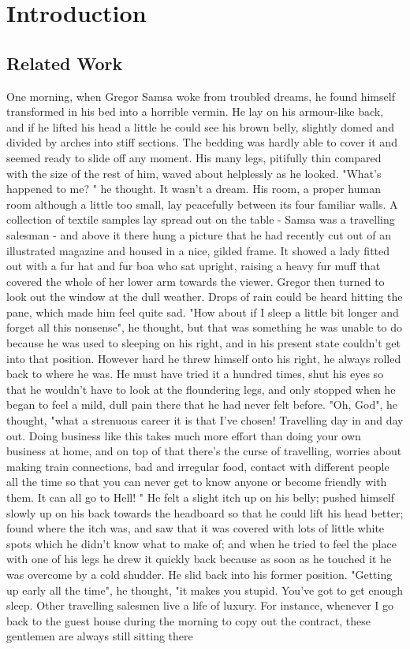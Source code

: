 \documentclass[
	listoffigures, 	%
	listoftables 	%
]{ifathesis}
\begin{document}
\chapter{Introduction}

\section{Related Work}

One morning, when Gregor Samsa woke from troubled dreams, he found himself transformed in his bed into a horrible vermin. He lay on his armour-like back, and if he lifted his head a little he could see his brown belly, slightly domed and divided by arches into stiff sections. The bedding was hardly able to cover it and seemed ready to slide off any moment. His many legs, pitifully thin compared with the size of the rest of him, waved about helplessly as he looked. "What's happened to me? " he thought. It wasn't a dream. His room, a proper human room although a little too small, lay peacefully between its four familiar walls. A collection of textile samples lay spread out on the table - Samsa was a travelling salesman - and above it there hung a picture that he had recently cut out of an illustrated magazine and housed in a nice, gilded frame. It showed a lady fitted out with a fur hat and fur boa who sat upright, raising a heavy fur muff that covered the whole of her lower arm towards the viewer. Gregor then turned to look out the window at the dull weather. Drops of rain could be heard hitting the pane, which made him feel quite sad. "How about if I sleep a little bit longer and forget all this nonsense", he thought, but that was something he was unable to do because he was used to sleeping on his right, and in his present state couldn't get into that position. However hard he threw himself onto his right, he always rolled back to where he was. He must have tried it a hundred times, shut his eyes so that he wouldn't have to look at the floundering legs, and only stopped when he began to feel a mild, dull pain there that he had never felt before. "Oh, God", he thought, "what a strenuous career it is that I've chosen! Travelling day in and day out. Doing business like this takes much more effort than doing your own business at home, and on top of that there's the curse of travelling, worries about making train connections, bad and irregular food, contact with different people all the time so that you can never get to know anyone or become friendly with them. It can all go to Hell! " He felt a slight itch up on his belly; pushed himself slowly up on his back towards the headboard so that he could lift his head better; found where the itch was, and saw that it was covered with lots of little white spots which he didn't know what to make of; and when he tried to feel the place with one of his legs he drew it quickly back because as soon as he touched it he was overcome by a cold shudder. He slid back into his former position. "Getting up early all the time", he thought, "it makes you stupid. You've got to get enough sleep. Other travelling salesmen live a life of luxury. For instance, whenever I go back to the guest house during the morning to copy out the contract, these gentlemen are always still sitting there 
\end{document}
